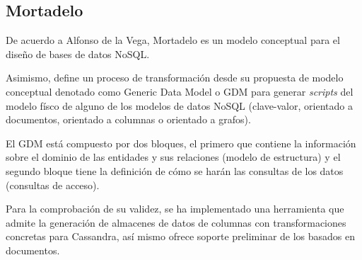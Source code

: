 \subsection{Mortadelo}
De acuerdo a Alfonso de la Vega\cite{de_la_vega_mortadelo_2020}, Mortadelo es un modelo conceptual para el diseño de bases de datos NoSQL. 


Asimismo, define un proceso de transformación desde su propuesta de modelo conceptual denotado como Generic Data Model o GDM para generar \textit{scripts} del modelo físco de alguno de los modelos de datos NoSQL (clave-valor, orientado a documentos, orientado a columnas o orientado a grafos). 


El GDM está compuesto por dos bloques, el primero que contiene la información sobre el dominio de las entidades y sus relaciones (modelo de estructura) y el segundo bloque tiene la definición de cómo se harán las consultas de los datos (consultas de acceso).


Para la comprobación de su validez, se ha implementado una herramienta que admite la generación de almacenes de datos de columnas con transformaciones concretas para Cassandra, así mismo ofrece soporte preliminar de los basados ​​en documentos.
